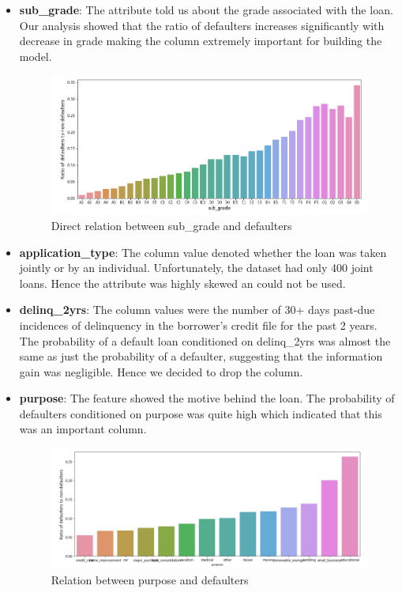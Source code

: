 \documentclass[conference]{IEEEtran}
\begin{document}
\begin{itemize}
    \item {\bf sub\_grade}: The attribute told us about the grade associated
        with the loan. Our analysis showed that the ratio of defaulters increases
        significantly with decrease in grade making the column extremely important
        for building the model.

        \begin{figure}[ht]
        \center\includegraphics[scale=0.3]{sub_grade}
            \caption{Direct relation between sub\_grade and defaulters}
        \end{figure}

    \item {\bf application\_type}: The column value denoted whether
        the loan was taken jointly or by an individual. Unfortunately,
        the dataset had only 400 joint loans. Hence the attribute was highly
        skewed an could not be used.

    \item {\bf delinq\_2yrs}: The column values were the number of 30+ days past-due
        incidences of delinquency in the borrower's credit file for the past 2
        years. The probability of a default loan conditioned on delinq\_2yrs
        was almost the same as just the probability of a defaulter, suggesting
        that the information gain was negligible. Hence we decided to drop the
        column.

    \item {\bf purpose}: The feature showed the motive behind the loan. The
        probability of defaulters conditioned on purpose was quite high which
        indicated that this was an important column.

        \begin{figure}[ht]
        \center\includegraphics[scale=0.3]{purpose}
            \caption{Relation between purpose and defaulters}
        \end{figure}
\end{itemize}
\end{document}
